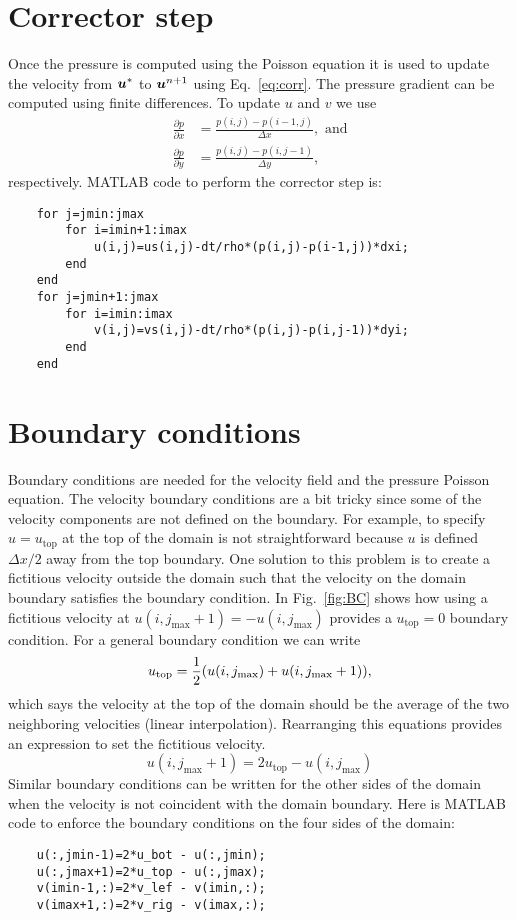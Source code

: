 \documentclass[]{article}
\def\bm#1{\mbox{\boldmath{$#1$}}}
\let\originalleft\left
\let\originalright\right
\renewcommand{\left}{\mathopen{}\mathclose\bgroup\originalleft}
\renewcommand{\right}{\aftergroup\egroup\originalright}
\begin{document}
\section{Corrector step}\label{sec:corr}
Once the pressure is computed using the Poisson equation it is used to update the velocity from $\bm{u}^*$ to $\bm{u}^{n+1}$ using Eq.~\ref{eq:corr}.
The pressure gradient can be computed using finite differences.  To update $u$ and $v$ we use
\begin{align}
  \frac{\partial p}{\partial x}&=\frac{p(i,j)-p(i-1,j)}{\Delta x},\text{ and}\\
  \frac{\partial p}{\partial y}&=\frac{p(i,j)-p(i,j-1)}{\Delta y},
\end{align}
respectively.  MATLAB code to perform the corrector step is:
\begin{lstlisting}
    for j=jmin:jmax
        for i=imin+1:imax
            u(i,j)=us(i,j)-dt/rho*(p(i,j)-p(i-1,j))*dxi;
        end
    end
    for j=jmin+1:jmax
        for i=imin:imax
            v(i,j)=vs(i,j)-dt/rho*(p(i,j)-p(i,j-1))*dyi;
        end
    end
\end{lstlisting}

\newpage
\section{Boundary conditions}\label{sec:BC}

Boundary conditions are needed for the velocity field and the pressure Poisson equation.  The velocity boundary conditions are a bit tricky since some of the velocity components are not defined on the boundary.  For example, to specify $u=u_\text{top}$ at the top of the domain is not straightforward because $u$ is defined $\Delta x/2$ away from the top boundary.  One solution to this problem is to create a fictitious velocity outside the domain such that the velocity on the domain boundary satisfies the boundary condition.  In Fig.~\ref{fig:BC} shows how using a fictitious velocity at $u(i,j_\text{max}+1)=-u(i,j_\text{max})$ provides a $u_\text{top}=0$ boundary condition.  For a general boundary condition we can write
\begin{equation}
  u_\text{top} = \frac{1}{2}\left(u(i,j_\text{max})+u(i,j_\text{max}+1)\right),
\end{equation}
which says the velocity at the top of the domain should be the average of the two neighboring velocities (linear interpolation).  Rearranging this equations provides an expression to set the fictitious velocity.
\begin{equation}
  u(i,j_\text{max}+1) = 2 u_\text{top} - u(i,j_\text{max})
\end{equation}
Similar boundary conditions can be written for the other sides of the domain when the velocity is not coincident with the domain boundary.  Here is MATLAB code to enforce the boundary conditions on the four sides of the domain:
\begin{lstlisting}
    u(:,jmin-1)=2*u_bot - u(:,jmin);
    u(:,jmax+1)=2*u_top - u(:,jmax);
    v(imin-1,:)=2*v_lef - v(imin,:);
    v(imax+1,:)=2*v_rig - v(imax,:);
\end{lstlisting}
\end{document}
